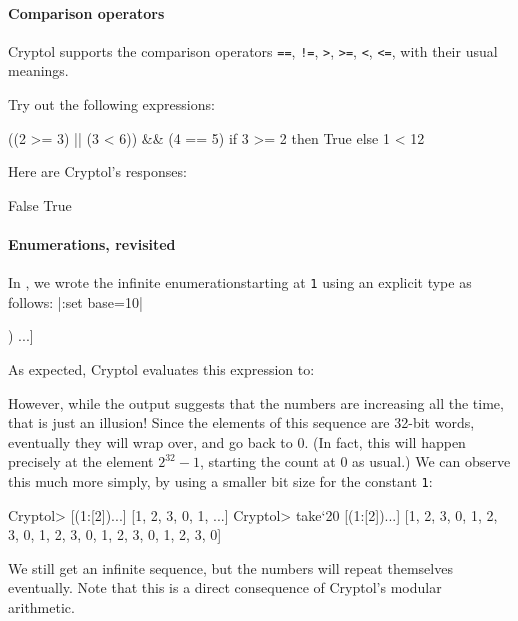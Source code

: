 \paragraph*{Comparison operators} Cryptol supports the comparison
operators {\tt ==}, {\tt !=}, {\tt >}, {\tt >=}, {\tt <}, {\tt <=},
with their usual meanings.\indEq\indNeq\indGt\indGte\indLt\indLte

\restartrepl
\begin{Exercise}\label{ex:arith:8}
Try out the following expressions:
\begin{replinVerb}
  ((2 >= 3) || (3 < 6)) && (4 == 5)
  if 3 >= 2 then True else 1 < 12
\end{replinVerb}
\end{Exercise}
\begin{Answer}
Here are Cryptol's responses:
\begin{reploutVerb}
False
True
\end{reploutVerb}
\end{Answer}

\paragraph*{Enumerations, revisited} In
, we wrote the infinite
enumeration{\indEnum\indInfSeq}starting at {\tt 1} using an explicit
type as follows:
\restartrepl
\hidereplin|:set base=10|
\begin{replinVerb}
  [(1:[32]) ...]
\end{replinVerb}
As expected, Cryptol evaluates this expression to:
\begin{reploutVerb}
  [1, 2, 3, 4, 5, ...]
\end{reploutVerb}
However, while the output suggests that the numbers are increasing all
the time, that is just an illusion! Since the elements of this
sequence are 32-bit words, eventually they will wrap over, and go back
to 0. (In fact, this will happen precisely at the element $2^{32}-1$,
starting the count at 0 as usual.) We can observe this much more
simply, by using a smaller bit size for the constant {\tt 1}:
\begin{replPrompt}
  Cryptol> [(1:[2])...]
  [1, 2, 3, 0, 1, ...]
  Cryptol> take`{20} [(1:[2])...]
  [1, 2, 3, 0, 1, 2, 3, 0, 1, 2, 3, 0, 1, 2, 3, 0, 1, 2, 3, 0]
\end{replPrompt}
We still get an infinite sequence, but the numbers will repeat
themselves eventually. Note that this is a direct consequence of
Cryptol's modular arithmetic.\indModular

